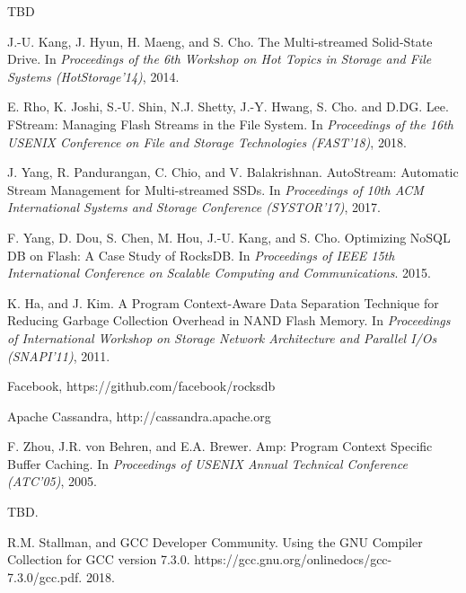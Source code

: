 

\begin{thebibliography}{00}

TBD

J.-U. Kang, J. Hyun, H. Maeng, and S. Cho. The Multi-streamed Solid-State Drive.
In \textit{Proceedings of the 6th Workshop on Hot Topics in Storage and File Systems (HotStorage'14)}, 2014.



E. Rho, K. Joshi, S.-U. Shin, N.J. Shetty, J.-Y. Hwang, S. Cho. and D.DG. Lee. 
FStream: Managing Flash Streams in the File System.
In \textit{Proceedings of the 16th USENIX Conference on File and Storage Technologies (FAST'18)}, 2018.

J. Yang, R. Pandurangan, C. Chio, and V. Balakrishnan.
AutoStream: Automatic Stream Management for Multi-streamed SSDs.
In \textit{Proceedings of 10th ACM International Systems and Storage Conference (SYSTOR'17)}, 2017.

F. Yang, D. Dou, S. Chen, M. Hou, J.-U. Kang, and S. Cho.
Optimizing NoSQL DB on Flash: A Case Study of RocksDB.
In \textit{Proceedings of IEEE 15th International Conference on Scalable Computing
and Communications}. 2015.

K. Ha, and J. Kim.
A Program Context-Aware Data Separation Technique for Reducing Garbage Collection Overhead in NAND Flash Memory.
In \textit{Proceedings of International Workshop on Storage Network Architecture 
and Parallel I/Os (SNAPI'11)}, 2011.

Facebook, https://github.com/facebook/rocksdb

Apache Cassandra, http://cassandra.apache.org

F. Zhou, J.R. von Behren, and E.A. Brewer.
Amp: Program Context Specific Buffer Caching.
In \textit{Proceedings of USENIX Annual Technical Conference (ATC'05)}, 2005.


TBD.

R.M. Stallman, and GCC Developer Community.
Using the GNU Compiler Collection for GCC version 7.3.0.
https://gcc.gnu.org/onlinedocs/gcc-7.3.0/gcc.pdf. 2018.

\end{thebibliography}
